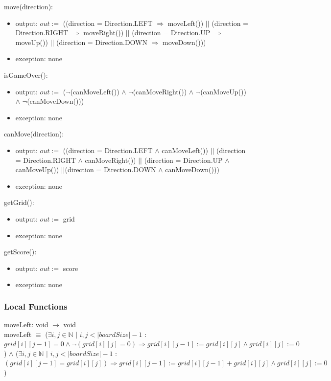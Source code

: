 \documentclass[12pt]{article}
\begin{document}
\noindent move(direction):
\begin{itemize}
\item output: $out :=$ ((direction = Direction.LEFT $\Rightarrow$ moveLeft()) $||$ (direction = Direction.RIGHT $\Rightarrow$ moveRight()) $||$ (direction = Direction.UP $\Rightarrow$ moveUp()) $||$ (direction = Direction.DOWN $\Rightarrow$ moveDown()))  
\item exception: none
\end{itemize}

\noindent isGameOver():
\begin{itemize}
\item output: $out :=$ ($\lnot$(canMoveLeft()) $\wedge$ $\lnot$(canMoveRight()) $\wedge$ $\lnot$(canMoveUp()) $\wedge$ $\lnot$(canMoveDown()))
\item exception: none
\end{itemize}

\noindent canMove(direction):
\begin{itemize}
\item output: $out :=$ ((direction = Direction.LEFT $\wedge$ canMoveLeft()) $||$ (direction = Direction.RIGHT $\wedge$ canMoveRight()) $||$ (direction = Direction.UP $\wedge$ canMoveUp()) $||$(direction = Direction.DOWN $\wedge$ canMoveDown()))  
\item exception: none
\end{itemize}

\noindent getGrid():
\begin{itemize}
\item output: $out :=$ grid  
\item exception: none
\end{itemize}

\noindent getScore():
\begin{itemize}
\item output: $out :=$ score  
\item exception: none
\end{itemize}

\subsubsection* {Local Functions}

\noindent moveLeft: void $\rightarrow$ void \\
moveLeft $\equiv$ ($\exists i, j \in \mathbb{N}$ $|$ $i,j < |boardSize|-1$ : $grid[i][j-1]=0 \wedge \lnot (grid[i][j]=0) \Rightarrow grid[i][j-1] := grid[i][j] \wedge grid[i][j]:=0$) $\wedge$ ($\exists i, j \in \mathbb{N}$ $|$ $i,j < |boardSize|-1$ : $(grid[i][j-1] = grid[i][j]) \Rightarrow grid[i][j-1] := grid[i][j-1] + grid[i][j] \wedge grid[i][j]:=0$)\\
\end{document}
